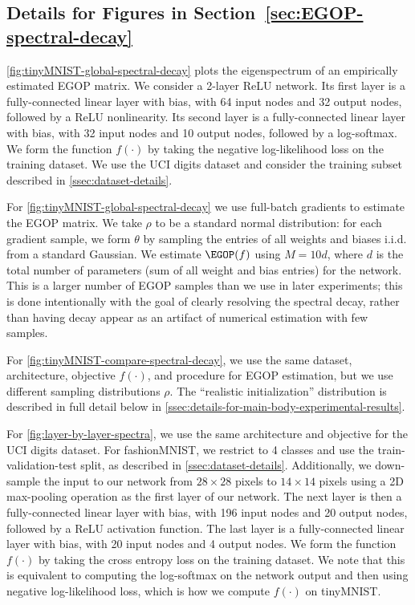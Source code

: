 \subsection{Details for Figures in Section~\ref{sec:EGOP-spectral-decay}}\label{ssec:details-for-spectral-decay} 

\cref{fig:tinyMNIST-global-spectral-decay} plots the eigenspectrum of an empirically estimated EGOP matrix. We consider a 2-layer ReLU network. Its first layer is a  fully-connected linear layer with bias, with 64 input nodes and 32 output nodes, followed by a ReLU nonlinearity. Its second layer is a fully-connected linear layer with bias, with 32 input nodes and 10 output nodes, followed by a log-softmax. We form the function $f(\cdot)$ by taking the negative log-likelihood loss on the training dataset. We use the UCI digits dataset and consider the training subset described in \cref{ssec:dataset-details}.

For \cref{fig:tinyMNIST-global-spectral-decay} we use full-batch gradients to estimate the EGOP matrix. We take $\rho$ to be a standard normal distribution: for each gradient sample, we form $\theta$ by sampling the entries of all weights and biases i.i.d. from a standard Gaussian. We estimate $\EGOP(f)$ using $M = 10d$, where $d$ is the total number of parameters (sum of all weight and bias entries) for the network. This is a larger number of EGOP samples than we use in later experiments; this is done intentionally with the goal of clearly resolving the spectral decay, rather than having decay appear as an artifact of numerical estimation with few samples.

For \cref{fig:tinyMNIST-compare-spectral-decay}, we use the same dataset, architecture, objective $f(\cdot)$, and procedure for EGOP estimation, but we use different sampling distributions $\rho$. The ``realistic initialization'' distribution is described in full detail below in \cref{ssec:details-for-main-body-experimental-results}.

For \cref{fig:layer-by-layer-spectra}, we use the same architecture and objective for the UCI digits dataset. For fashionMNIST, we restrict to 4 classes and use the train-validation-test split, as described in \ref{ssec:dataset-details}. Additionally, we down-sample the input to our network from $28\times 28$ pixels to $14\times 14$ pixels using a 2D max-pooling operation as the first layer of our network. The next layer is then a fully-connected linear layer with bias, with 196 input nodes and 20 output nodes, followed by a ReLU activation function. The last layer is a fully-connected linear layer with bias, with 20 input nodes and 4 output nodes. We form the function $f(\cdot)$ by taking the cross entropy loss on the training dataset. We note that this is equivalent to computing the log-softmax on the network output and then using negative log-likelihood loss, which is how we compute $f(\cdot)$ on tinyMNIST.

